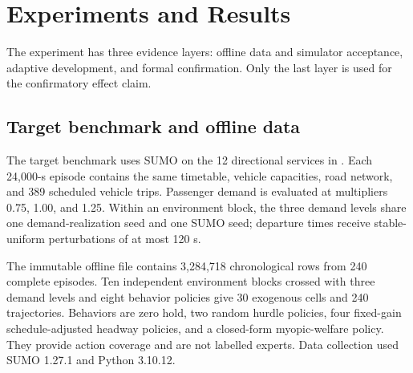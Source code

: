 \section{Experiments and Results}
\label{sec:experiments}

The experiment has three evidence layers: offline data and simulator
acceptance, adaptive development, and formal confirmation. Only the last layer
is used for the confirmatory effect claim.

\subsection{Target benchmark and offline data}
\label{sec:exp:benchmark}

The target benchmark uses SUMO on the 12 directional services in
. Each 24,000-s episode contains the same timetable,
vehicle capacities, road network, and 389 scheduled vehicle trips. Passenger
demand is evaluated at multipliers 0.75, 1.00, and 1.25. Within an environment
block, the three demand levels share one demand-realization seed and one SUMO
seed; departure times receive stable-uniform perturbations of at most 120 s.

The immutable offline file contains 3,284,718 chronological rows from 240
complete episodes. Ten independent environment blocks crossed with three
demand levels and eight behavior policies give 30 exogenous cells and 240
trajectories. Behaviors are zero hold, two random hurdle policies, four
fixed-gain schedule-adjusted headway policies, and a closed-form myopic-welfare
policy. They provide action coverage and are not labelled experts. Data
collection used SUMO 1.27.1 and Python 3.10.12.

